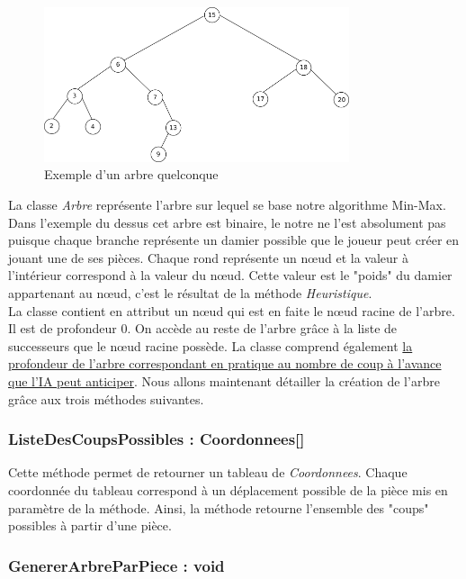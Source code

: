 \documentclass[12,french]{report}
\begin{document}
\begin{figure}[H]
	\center
	\includegraphics[width=0.8\textwidth]{./Images/arbre}
	\caption{Exemple d'un arbre quelconque}
\end{figure}\vspace{0.2cm}

La classe \textit{Arbre} représente l'arbre sur lequel se base notre algorithme Min-Max. Dans l'exemple du dessus cet arbre est binaire, le notre ne l'est absolument pas puisque chaque branche représente un damier possible que le joueur peut créer en jouant une de ses pièces. Chaque rond représente un nœud et la valeur à l'intérieur correspond à la valeur du nœud. Cette valeur est le "poids" du damier appartenant au nœud, c'est le résultat de la méthode \textit{Heuristique}.\\

La classe contient en attribut un nœud qui est en faite le nœud racine de l'arbre. Il est de profondeur 0. On accède au reste de l'arbre grâce à la liste de successeurs que le nœud racine possède. La classe comprend également \uline{la profondeur de l'arbre correspondant en pratique au nombre de coup à l'avance que l'IA peut anticiper}. Nous allons maintenant détailler la création de l'arbre grâce aux trois méthodes suivantes.\\

\subsubsection{ListeDesCoupsPossibles : Coordonnees[]}

Cette méthode permet de retourner un tableau de \textit{Coordonnees}. Chaque coordonnée du tableau correspond à un déplacement possible de la pièce mis en paramètre de la méthode. Ainsi, la méthode retourne l'ensemble des "coups" possibles à partir d'une pièce.

\subsubsection{GenererArbreParPiece : void}
\end{document}
